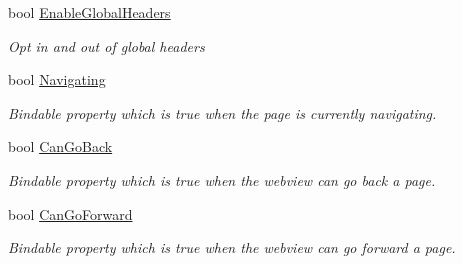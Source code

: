 \begin{DoxyCompactItemize}
bool \hyperlink{class_xam_1_1_plugin_1_1_web_view_1_1_abstractions_1_1_forms_web_view_a67ec337bf46584a17f2197fd2fe12b93}{Enable\+Global\+Headers}
\begin{DoxyCompactList}\small\item\em Opt in and out of global headers \end{DoxyCompactList}\item 
bool \hyperlink{class_xam_1_1_plugin_1_1_web_view_1_1_abstractions_1_1_forms_web_view_a63f9c0f6a44497e9febc0b4922cbe838}{Navigating}
\begin{DoxyCompactList}\small\item\em Bindable property which is true when the page is currently navigating. \end{DoxyCompactList}\item 
bool \hyperlink{class_xam_1_1_plugin_1_1_web_view_1_1_abstractions_1_1_forms_web_view_a59e06c36a967be7d282fad49ad08fe8b}{Can\+Go\+Back}
\begin{DoxyCompactList}\small\item\em Bindable property which is true when the webview can go back a page. \end{DoxyCompactList}\item 
bool \hyperlink{class_xam_1_1_plugin_1_1_web_view_1_1_abstractions_1_1_forms_web_view_aa311b0f3eff14d5edc8e37f42175168e}{Can\+Go\+Forward}
\begin{DoxyCompactList}\small\item\em Bindable property which is true when the webview can go forward a page. \end{DoxyCompactList}\end{DoxyCompactItemize}
